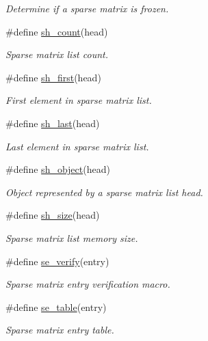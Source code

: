 \begin{CompactItemize}
\begin{CompactList}\small\item\em Determine if a sparse matrix is frozen.\item\end{CompactList}\item 
\#define \hyperlink{group__dbprim__smat_a34}{sh\_\-count}(head)
\begin{CompactList}\small\item\em Sparse matrix list count.\item\end{CompactList}\item 
\#define \hyperlink{group__dbprim__smat_a35}{sh\_\-first}(head)
\begin{CompactList}\small\item\em First element in sparse matrix list.\item\end{CompactList}\item 
\#define \hyperlink{group__dbprim__smat_a36}{sh\_\-last}(head)
\begin{CompactList}\small\item\em Last element in sparse matrix list.\item\end{CompactList}\item 
\#define \hyperlink{group__dbprim__smat_a37}{sh\_\-object}(head)
\begin{CompactList}\small\item\em Object represented by a sparse matrix list head.\item\end{CompactList}\item 
\#define \hyperlink{group__dbprim__smat_a38}{sh\_\-size}(head)
\begin{CompactList}\small\item\em Sparse matrix list memory size.\item\end{CompactList}\item 
\#define \hyperlink{group__dbprim__smat_a39}{se\_\-verify}(entry)
\begin{CompactList}\small\item\em Sparse matrix entry verification macro.\item\end{CompactList}\item 
\#define \hyperlink{group__dbprim__smat_a40}{se\_\-table}(entry)
\begin{CompactList}\small\item\em Sparse matrix entry table.\item\end{CompactList}\item 

\end{CompactItemize}
